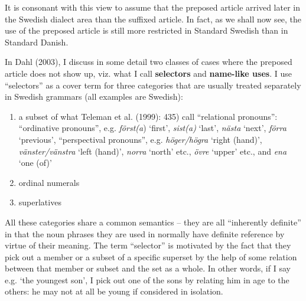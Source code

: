 It is consonant with this view to assume that the preposed article arrived later in the Swedish dialect area than the suffixed article. In fact, as we shall now see, the use of the preposed article is still more restricted in Standard Swedish than in Standard Danish. 

In Dahl (2003), I discuss in some detail two classes of cases where the preposed article does not show up, viz. what I call \textbf{selectors} and \textbf{name-like uses}. I use “selectors” as a cover term for three categories that are usually treated separately in Swedish grammars (all examples are Swedish):

\begin{enumerate} %
\item 
a subset of what Teleman et al. (1999): 435) call “relational pronouns”: “ordinative pronouns”, e.g. \textit{först(a}) ‘first’, \textit{sist(a)} ‘last’, \textit{nästa} ‘next’, \textit{förra }‘previous’, “perspectival pronouns”, e.g. \textit{höger/högra }‘right (hand)’, \textit{vänster/vänstra} ‘left (hand)’, \textit{norra} ‘north’ etc., \textit{övre} ‘upper’ etc., and \textit{ena} ‘one (of)’ 

\item 
ordinal numerals

\item 
superlatives

\end{enumerate} %
All these categories share a common semantics – they are all “inherently definite” in that the noun phrases they are used in normally have definite reference by virtue of their meaning. The term “selector” is motivated by the fact that they pick out a member or a subset of a specific superset by the help of some relation between that member or subset and the set as a whole. In other words, if I say e.g.  ‘the youngest son’, I pick out one of the sons by relating him in age to the others: he may not at all be young if considered in isolation. 

